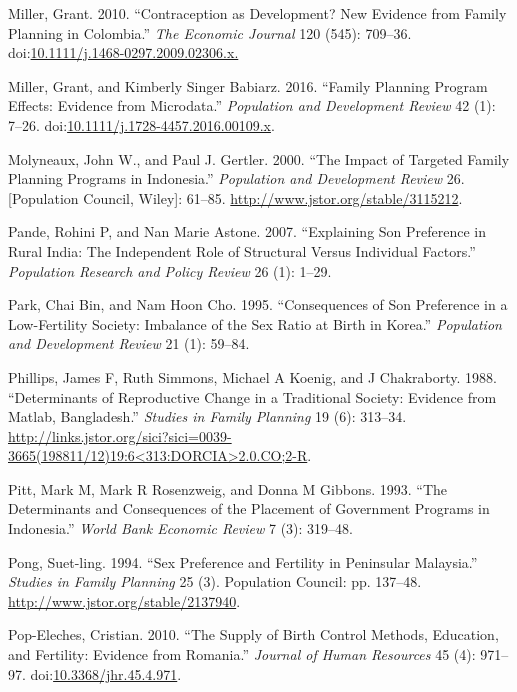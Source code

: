 \documentclass[]{article}
\begin{document}
\hypertarget{ref-Miller2010}{}
Miller, Grant. 2010. ``Contraception as Development? New Evidence from Family Planning in Colombia.'' \emph{The Economic Journal} 120 (545): 709--36. doi:\href{https://doi.org/10.1111/j.1468-0297.2009.02306.x.}{10.1111/j.1468-0297.2009.02306.x.}

\hypertarget{ref-Miller2016}{}
Miller, Grant, and Kimberly Singer Babiarz. 2016. ``Family Planning Program Effects: Evidence from Microdata.'' \emph{Population and Development Review} 42 (1): 7--26. doi:\href{https://doi.org/10.1111/j.1728-4457.2016.00109.x}{10.1111/j.1728-4457.2016.00109.x}.

\hypertarget{ref-Molyneaux2000}{}
Molyneaux, John W., and Paul J. Gertler. 2000. ``The Impact of Targeted Family Planning Programs in Indonesia.'' \emph{Population and Development Review} 26. {[}Population Council, Wiley{]}: 61--85. \url{http://www.jstor.org/stable/3115212}.

\hypertarget{ref-pande07}{}
Pande, Rohini P, and Nan Marie Astone. 2007. ``Explaining Son Preference in Rural India: The Independent Role of Structural Versus Individual Factors.'' \emph{Population Research and Policy Review} 26 (1): 1--29.

\hypertarget{ref-park95}{}
Park, Chai Bin, and Nam Hoon Cho. 1995. ``Consequences of Son Preference in a Low-Fertility Society: Imbalance of the Sex Ratio at Birth in Korea.'' \emph{Population and Development Review} 21 (1): 59--84.

\hypertarget{ref-Phillips1988}{}
Phillips, James F, Ruth Simmons, Michael A Koenig, and J Chakraborty. 1988. ``Determinants of Reproductive Change in a Traditional Society: Evidence from Matlab, Bangladesh.'' \emph{Studies in Family Planning} 19 (6): 313--34. \href{http://links.jstor.org/sici?sici=0039-3665(198811/12)19:6\%3C313:DORCIA\%3E2.0.CO;2-R}{http://links.jstor.org/sici?sici=0039-3665(198811/12)19:6\textless{}313:DORCIA\textgreater{}2.0.CO;2-R}.

\hypertarget{ref-pitt93}{}
Pitt, Mark M, Mark R Rosenzweig, and Donna M Gibbons. 1993. ``The Determinants and Consequences of the Placement of Government Programs in Indonesia.'' \emph{World Bank Economic Review} 7 (3): 319--48.

\hypertarget{ref-Pong1994}{}
Pong, Suet-ling. 1994. ``Sex Preference and Fertility in Peninsular Malaysia.'' \emph{Studies in Family Planning} 25 (3). Population Council: pp. 137--48. \url{http://www.jstor.org/stable/2137940}.

\hypertarget{ref-Pop-Eleches2010}{}
Pop-Eleches, Cristian. 2010. ``The Supply of Birth Control Methods, Education, and Fertility: Evidence from Romania.'' \emph{Journal of Human Resources} 45 (4): 971--97. doi:\href{https://doi.org/10.3368/jhr.45.4.971}{10.3368/jhr.45.4.971}.
\end{document}
